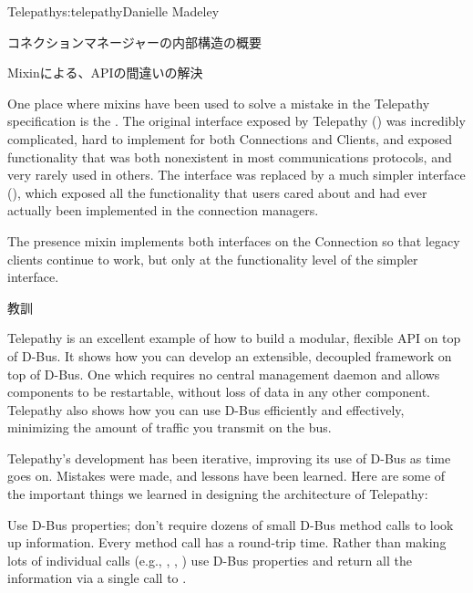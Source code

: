 \begin{aosachapter}{Telepathy}{s:telepathy}{Danielle Madeley}
\begin{aosasect1}{コネクションマネージャーの内部構造の概要}
\begin{aosabox}{Mixinによる、APIの間違いの解決}

One place where mixins have been used to solve a mistake in the
Telepathy specification is the .  The original
interface exposed by Telepathy
() was incredibly
complicated, hard to implement for both Connections and Clients, and
exposed functionality that was both nonexistent in most communications
protocols, and very rarely used in others. The interface was replaced
by a much simpler interface
(), which exposed all
the functionality that users cared about and had ever actually been
implemented in the connection managers.

The presence mixin implements both interfaces on the Connection so
that legacy clients continue to work, but only at the functionality
level of the simpler interface.

\end{aosabox}

\end{aosasect1}

\begin{aosasect1}{教訓}

Telepathy is an excellent example of how to build a modular, flexible
API on top of D-Bus. It shows how you can develop an extensible,
decoupled framework on top of D-Bus. One which requires no central
management daemon and allows components to be restartable, without
loss of data in any other component.  Telepathy also shows how you can
use D-Bus efficiently and effectively, minimizing the amount of
traffic you transmit on the bus.

Telepathy's development has been iterative, improving its use of D-Bus
as time goes on. Mistakes were made, and lessons have been learned.
Here are some of the important things we learned in designing the
architecture of Telepathy:

\begin{aosadescription}

  \item{Use D-Bus properties; don't require dozens of small D-Bus
    method calls to look up information.}  Every method call has a
    round-trip time. Rather than making lots of individual calls
    (e.g., , ,
    ) use D-Bus properties and return all the
    information via a single call to .


\end{aosadescription}
\end{aosasect1}
\end{aosachapter}
